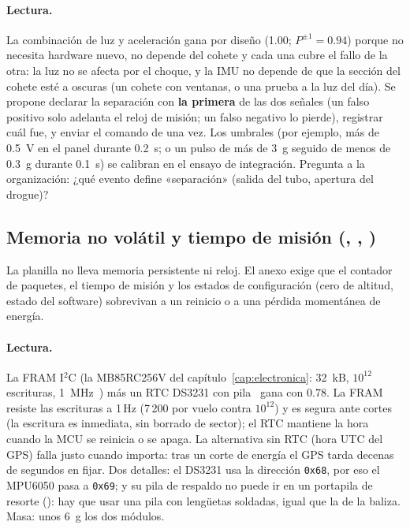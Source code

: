 \begin{table}[H]
\centering\small
\caption{Decisión de la detección de separación.}\label{tab:sens-sep}

\end{table}

\paragraph{Lectura.} La combinación de luz y aceleración gana por diseño (\num{1.00}; $P^{\pm1}=\num{0.94}$)
porque no necesita hardware nuevo, no depende del cohete y cada una cubre el fallo de la otra: la luz
no se afecta por el choque, y la IMU no depende de que la sección del cohete esté a oscuras (un cohete con
ventanas, o una prueba a la luz del día). Se propone declarar la separación con \textbf{la primera}
de las dos señales (un falso positivo solo adelanta el reloj de misión; un falso negativo lo
pierde), registrar cuál fue, y enviar el comando de  una vez. Los umbrales (por ejemplo,
más de \SI{0.5}{V} en el panel durante \SI{0.2}{s}; o un pulso de más de \SI{3}{g} seguido de
menos de \SI{0.3}{g} durante \SI{0.1}{s}) se calibran en el ensayo de integración. Pregunta
a la organización: ¿qué evento define «separación» (salida del tubo, apertura del drogue)?

\subsection{Memoria no volátil y tiempo de misión (\texorpdfstring{, , }{F1, F2, F5})}
La planilla no lleva memoria persistente ni reloj. El anexo exige que el contador de paquetes, el
tiempo de misión y los estados de configuración (cero de altitud, estado del software)
sobrevivan a un reinicio o a una pérdida momentánea de energía.

\begin{table}[H]
\centering\small
\caption{Decisión de la memoria y el reloj.}\label{tab:sens-mem}

\end{table}

\paragraph{Lectura.} La FRAM I$^2$C (la MB85RC256V del capítulo~\ref{cap:electronica}:
\SI{32}{kB}, $10^{12}$ escrituras, \SI{1}{MHz}~\cite{electronica-mb85rc256v}) más un RTC
DS3231 con pila~\cite{sensores-ds3231} gana con \num{0.78}. La FRAM resiste las escrituras a
1\,Hz (7\,200 por vuelo contra $10^{12}$) y es segura ante cortes (la escritura es inmediata, sin
borrado de sector); el RTC mantiene la hora cuando la MCU se reinicia o se apaga. La alternativa
sin RTC (hora UTC del GPS) falla justo cuando importa: tras un corte de energía el GPS tarda
decenas de segundos en fijar. Dos detalles: el DS3231 usa la dirección \texttt{0x68}, por eso el
MPU6050 pasa a \texttt{0x69}; y su pila de respaldo no puede ir en un portapila de resorte
(): hay que usar una pila con lengüetas soldadas, igual que la de la baliza. Masa:
unos \SI{6}{g} los dos módulos.

